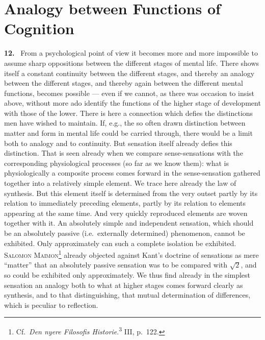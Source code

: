 \documentclass[12pt]{book}
\newcommand{\hnum}[1]{\noindent\textbf{#1.}~}
\newcommand{\opage}[1]{\marginnote{\footnotesize\textit{[#1]}}}
\begin{document}

\chapter{Analogy between Functions of Cognition}
\label{ch:3}

\hnum{12} From a psychological point of view it becomes more and more impossible
to assume sharp oppositions between the different stages of mental life. There
shows itself a constant continuity between the different stages, and thereby an
analogy between the different stages, and thereby again between the different
mental functions, becomes possible --- even if we cannot, as there was occasion
to insist above, without more ado identify the functions of the higher stage of
development with those of the lower. There is here a connection which defies the
distinctions men have wished to maintain. If, e.g., the so often drawn
distinction between matter and form in mental \opage{62}life could be carried through,
there would be a limit both to analogy and to continuity. But sensation itself
already defies this distinction. That is seen already when we compare
sense-sensations with the corresponding physiological processes (so far as we
know them): what is physiologically a composite process comes forward in the
sense-sensation gathered together into a relatively simple element. We trace
here already the law of synthesis. But this element itself is determined from
the very outset partly by its relation to immediately preceding elements, partly
by its relation to elements appearing at the same time. And very quickly
reproduced elements are woven together with it. An absolutely simple and
independent sensation, which should be an absolutely passive (i.e.\ externally
determined) phenomenon, cannot be exhibited. Only approximately can such a
complete isolation be exhibited. \textsc{Salomon Maimon}\footnote{Cf.\
\textit{Den nyere Filosofis Historie}.\textsuperscript{3} III, p.\ 122.} already
objected against Kant's doctrine of sensations as mere ``matter'' that an
absolutely passive sensation was to be compared with $\sqrt{2}$, and so could be
exhibited only approximately. We thus find already in the simplest sensation an
analogy both to what at higher stages comes forward clearly as synthesis, and to
that distinguishing, that mutual determination of differences, which is peculiar
to reflection.
\end{document}
